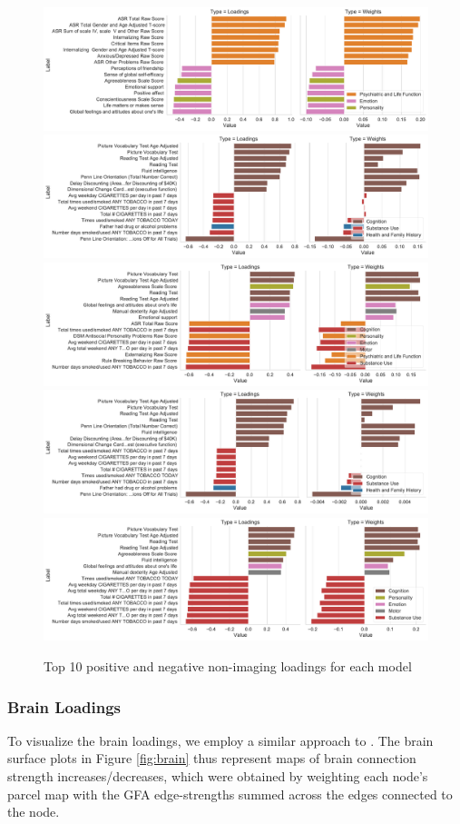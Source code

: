 \begin{figure}
\centering
\includegraphics[width=0.72\linewidth]{figures/regularization/hcp/PCA behaviour weights and loadings.pdf}
\includegraphics[width=0.72\linewidth]{figures/regularization/hcp/RCCA behaviour weights and loadings.pdf}
\includegraphics[width=0.72\linewidth]{figures/regularization/hcp/PLS behaviour weights and loadings.pdf}
\includegraphics[width=0.72\linewidth]{figures/regularization/hcp/ElasticNet behaviour weights and loadings.pdf}
\includegraphics[width=0.72\linewidth]{figures/regularization/hcp/SPLS behaviour weights and loadings.pdf}
\caption{Top 10 positive and negative non-imaging loadings for each model}
\label{fig:behaviour}
\end{figure}

\subsubsection{Brain Loadings}
To visualize the brain loadings, we employ a similar approach to \citep{ferreira2022hierarchical, smith2015positive}.
The brain surface plots in Figure \ref{fig:brain} thus represent maps of brain connection strength increases/decreases, which
were obtained by weighting each node’s parcel map with the GFA edge-strengths summed across the edges
connected to the node.

